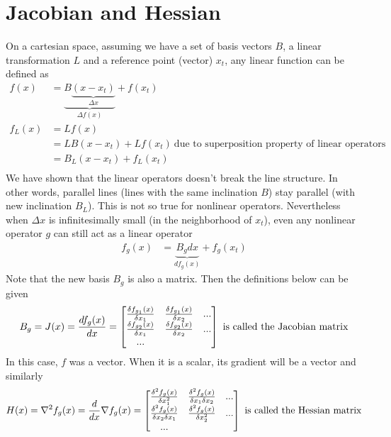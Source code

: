 \documentclass{book}
\numberwithin{equation}{subsection}
\begin{document}
\section{Jacobian and Hessian}
\label{jacobian_hessian}
On a cartesian space, assuming we have a set of basis vectors $B$, a linear transformation $L$ and a reference point (vector) $x_t$, any linear function can be defined as
\begin{align}
    f(x) &= \underbrace{B\underbrace{(x-x_t)}_{\Delta x}}_{\Delta f(x)} + f(x_t)\\
    f_L(x) &= Lf(x)\\
    &= LB(x-x_t)+Lf(x_t)\ \text{due to superposition property of linear operators}\\
    &= B_L(x-x_t)+f_L(x_t)\\
\end{align}
We have shown that the linear operators doesn't break the line structure. In other words, parallel lines (lines with the same inclination $B$) stay parallel (with new inclination $B_L$). This is not so true for nonlinear operators.
Nevertheless when $\Delta x$ is infinitesimally small (in the neighborhood of $x_t$), even any nonlinear operator $g$ can still act as a linear operator
\begin{align}
    f_g(x) &= \underbrace{B_gdx}_{df_g(x)}+f_g(x_t)
\end{align}
Note that the new basis $B_g$ is also a matrix. Then the definitions below can be given
\begin{equation}
    B_g = J(x) = \frac{df_g(x)}{dx} = \begin{bmatrix}
        \frac{\delta f_{g_1}(x)}{\delta x_1} & \frac{\delta f_{g_1}(x)}{\delta x_2} & ... \\
        \frac{\delta f_{g_2}(x)}{\delta x_1} & \frac{\delta f_{g_2}(x)}{\delta x_2} & ... \\
        ...
    \end{bmatrix}\ \text{is called the Jacobian matrix}\\
\end{equation}
In this case, $f$ was a vector. When it is a scalar, its gradient will be a vector and similarly
\begin{equation}
    H(x) = \nabla^2f_g(x) = \frac{d}{dx}\nabla f_g(x) = \begin{bmatrix}
        \frac{\delta^2 f_g(x)}{\delta x_1^2} & \frac{\delta^2 f_g(x)}{\delta x_1 \delta x_2} & ... \\
        \frac{\delta^2 f_g(x)}{\delta x_2 \delta x_1} & \frac{\delta^2 f_g(x)}{\delta x_2^2} & ... \\
        ...
    \end{bmatrix}\ \text{is called the Hessian matrix}\\
\end{equation}
\end{document}
